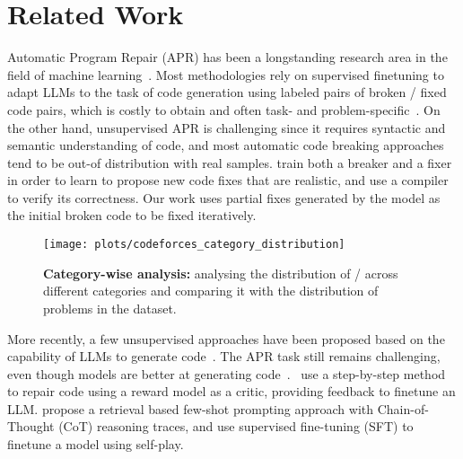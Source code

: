 \section{Related Work}
\label{sec:related_work}
Automatic Program Repair (APR) has been a longstanding research area in the field of machine learning~\citep{devlin2017semcode, bhatia2016synfix, chen2019sequencer, feng-etal-2020-codebert, berabi2021tfix, codit, circle}. Most methodologies rely on supervised finetuning to adapt LLMs to the task of code generation using labeled pairs of broken / fixed code pairs, which is costly to obtain and often task- and problem-specific~\citep{Hu2022nsedit,cure,xia2022alpharepair, dinella2020hoppity}. On the other hand, unsupervised APR is challenging since it requires syntactic and semantic understanding of code, and most automatic code breaking approaches tend to be out-of distribution with real samples. \citet{yasunaga2021pmlr} train both a breaker and a fixer in order to learn to propose new code fixes that are realistic, and use a compiler to verify its correctness. Our work uses partial fixes generated by the model as the initial broken code to be fixed iteratively.

\begin{figure}[t]
    \centering
    \texttt{[image: plots/codeforces\_category\_distribution]}
    \caption{\textbf{Category-wise analysis:} analysing the distribution of \aupairs/ across different categories and comparing it with the distribution of problems in the dataset.}
    \label{fig:category_analysis}
\end{figure}


More recently, a few unsupervised approaches have been proposed based on the capability of LLMs to generate code~\citep{chen2021evaluating,nijkamp2023codegen, chowdhery2024palmcoder, li2022alphacode, fried2023incoder, li2023starcoder}. The APR task still remains challenging, even though models are better at generating code~\citep{olausson2024self,chen2023teaching}. \citet{zhao2024repair}~use a step-by-step method to repair code using a reward model as a critic, providing feedback to finetune an LLM. \citet{shypula2024codeedits} propose a retrieval based few-shot prompting approach with Chain-of-Thought (CoT) reasoning traces, and use supervised fine-tuning (SFT) to finetune a model using self-play.

